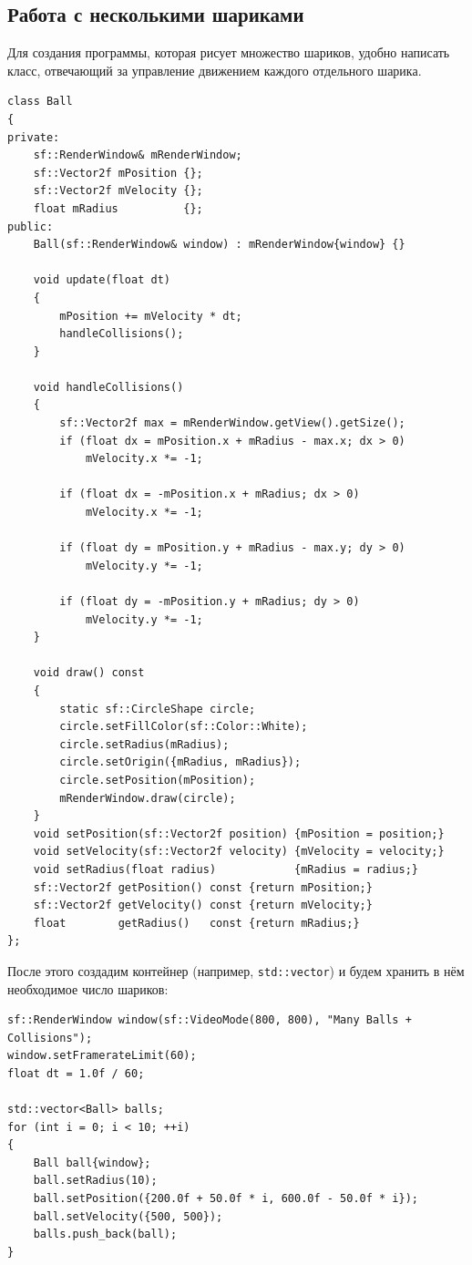 \documentclass{article}
\begin{document}
\subsection*{Работа с несколькими шариками}
Для создания программы, которая рисует множество шариков, удобно написать класс, отвечающий за управление движением каждого отдельного шарика.
\begin{lstlisting}
class Ball
{
private:
    sf::RenderWindow& mRenderWindow;
    sf::Vector2f mPosition {};
    sf::Vector2f mVelocity {};
    float mRadius          {};
public:
    Ball(sf::RenderWindow& window) : mRenderWindow{window} {}

    void update(float dt)
    {
        mPosition += mVelocity * dt;
        handleCollisions();
    }

    void handleCollisions()
    {
        sf::Vector2f max = mRenderWindow.getView().getSize();
        if (float dx = mPosition.x + mRadius - max.x; dx > 0)
            mVelocity.x *= -1;
            
        if (float dx = -mPosition.x + mRadius; dx > 0)
            mVelocity.x *= -1;

        if (float dy = mPosition.y + mRadius - max.y; dy > 0)
            mVelocity.y *= -1;

        if (float dy = -mPosition.y + mRadius; dy > 0)
            mVelocity.y *= -1;
    }

    void draw() const
    {
        static sf::CircleShape circle;
        circle.setFillColor(sf::Color::White);
        circle.setRadius(mRadius);
        circle.setOrigin({mRadius, mRadius});
        circle.setPosition(mPosition);
        mRenderWindow.draw(circle);
    }
    void setPosition(sf::Vector2f position) {mPosition = position;}
    void setVelocity(sf::Vector2f velocity) {mVelocity = velocity;}
    void setRadius(float radius)            {mRadius = radius;}
    sf::Vector2f getPosition() const {return mPosition;}
    sf::Vector2f getVelocity() const {return mVelocity;}
    float        getRadius()   const {return mRadius;}
};
\end{lstlisting}
После этого создадим контейнер (например, \texttt{std::vector}) и будем хранить в нём необходимое число шариков:
\begin{lstlisting}
sf::RenderWindow window(sf::VideoMode(800, 800), "Many Balls + Collisions");
window.setFramerateLimit(60);
float dt = 1.0f / 60;

std::vector<Ball> balls;
for (int i = 0; i < 10; ++i)
{
    Ball ball{window};
    ball.setRadius(10);
    ball.setPosition({200.0f + 50.0f * i, 600.0f - 50.0f * i});             
    ball.setVelocity({500, 500});
    balls.push_back(ball);
}
\end{lstlisting}
\end{document}
